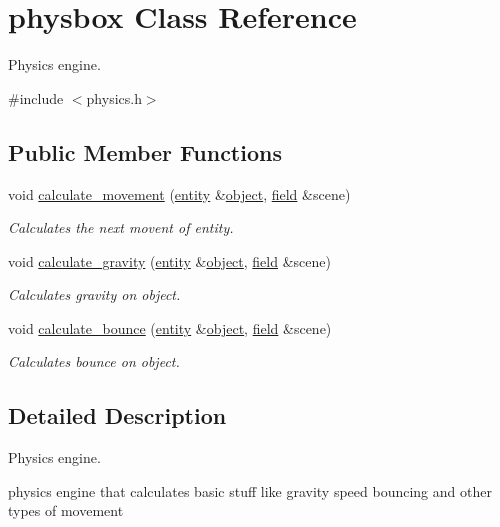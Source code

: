 \hypertarget{classphysbox}{}\section{physbox Class Reference}
\label{classphysbox}


Physics engine.  




{\ttfamily \#include $<$physics.\+h$>$}

\subsection*{Public Member Functions}
\begin{DoxyCompactItemize}
\item 
void \hyperlink{classphysbox_ab6ae32c018841713b135a1fc511b9518}{calculate\+\_\+movement} (\hyperlink{classentity}{entity} \&\hyperlink{classobject}{object}, \hyperlink{classfield}{field} \&scene)
\begin{DoxyCompactList}\small\item\em Calculates the next movent of entity. \end{DoxyCompactList}\item 
void \hyperlink{classphysbox_aacb7573b68494f352edb2697c5124571}{calculate\+\_\+gravity} (\hyperlink{classentity}{entity} \&\hyperlink{classobject}{object}, \hyperlink{classfield}{field} \&scene)
\begin{DoxyCompactList}\small\item\em Calculates gravity on object. \end{DoxyCompactList}\item 
void \hyperlink{classphysbox_a1e1ca37a18b94e3fab074120e65f7e03}{calculate\+\_\+bounce} (\hyperlink{classentity}{entity} \&\hyperlink{classobject}{object}, \hyperlink{classfield}{field} \&scene)
\begin{DoxyCompactList}\small\item\em Calculates bounce on object. \end{DoxyCompactList}\end{DoxyCompactItemize}


\subsection{Detailed Description}
Physics engine. 

physics engine that calculates basic stuff like gravity speed bouncing and other types of movement 

